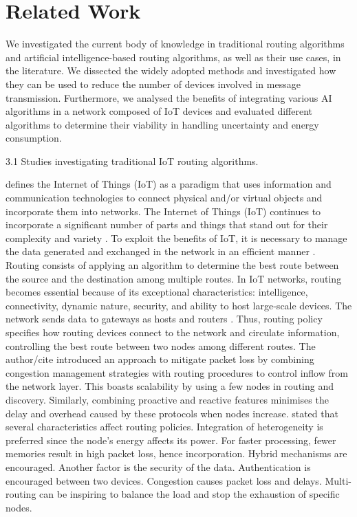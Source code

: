 \section{Related Work}
\label{sec:rel-work}


We investigated the current body of knowledge in traditional routing algorithms and artificial intelligence-based routing 
algorithms, as well as their use cases, in the literature. We dissected the widely adopted methods and investigated how they
can be used to reduce the number of devices involved in message transmission. Furthermore, we analysed the benefits of 
integrating various AI algorithms in a network composed of IoT devices and evaluated different algorithms to determine their 
viability in handling uncertainty and energy consumption.

3.1 Studies investigating traditional IoT routing algorithms.

\cite{plageras-psannis:2017} defines the Internet of Things (IoT) as a paradigm that uses information and communication 
technologies to connect physical and/or virtual objects and incorporate them into networks. The Internet of Things (IoT) 
continues to incorporate a significant number of parts and things that stand out for their complexity and variety 
\cite{amrioui-Sofiane-Hamrioui-Camil-Lloret-Jaime-Lorenz-Pascal:2018}. To exploit the benefits of IoT, it is necessary to manage 
the data generated and exchanged in the network in an efficient manner \cite{Tlili-Sihem-Mnasri-Sami-Val-hierry:2022}. 
Routing consists of applying an algorithm to determine the best route between the source and 
the destination among multiple routes. In IoT networks, routing becomes essential because of its exceptional characteristics: 
intelligence, connectivity, dynamic nature, security, and ability to host large-scale devices. The network sends data to gateways 
as hosts and routers \cite{AlZubi-Al-Maitah-Alarifi:2019}. Thus, routing policy specifies how routing devices connect to 
the network and circulate information, controlling the best route between two nodes among different routes. The author/cite 
introduced an approach to mitigate packet loss by combining congestion management strategies with routing procedures to control
 inflow from the network layer. This boasts scalability by using a few nodes in routing and discovery. Similarly, combining 
 proactive and reactive features minimises the delay and overhead caused by these protocols when nodes increase. 
 \cite{Tlili-Sihem-Mnasri-Sami-Val-hierry:2022} stated that several characteristics affect routing policies. Integration of heterogeneity is 
 preferred since the node’s energy affects its power. For faster processing, fewer memories result in high packet loss, 
 hence incorporation. Hybrid mechanisms are encouraged. Another factor is the security of the data. Authentication is 
 encouraged between two devices. Congestion causes packet loss and delays. Multi-routing can be inspiring to balance the 
 load and stop the exhaustion of specific nodes. 
 
